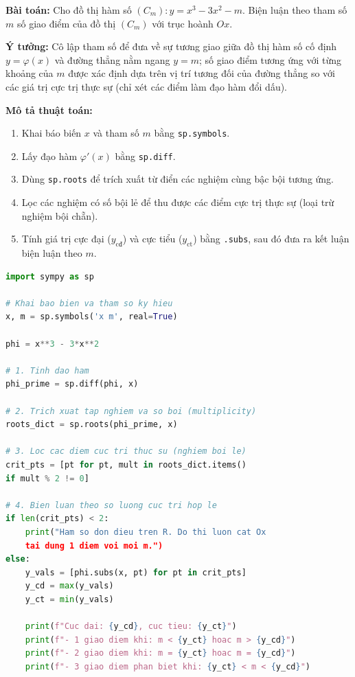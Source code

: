 \textbf{Bài toán:} Cho đồ thị hàm số $(C_m): y = x^3 - 3x^2 - m$. Biện luận theo tham số $m$ số giao điểm của đồ thị $(C_m)$ với trục hoành $Ox$.

\noindent\textbf{Ý tưởng:} Cô lập tham số để đưa về sự tương giao giữa đồ thị hàm số cố định $y = \varphi(x)$ và đường thẳng nằm ngang $y = m$; số giao điểm tương ứng với từng khoảng của $m$ được xác định dựa trên vị trí tương đối của đường thẳng so với các giá trị cực trị thực sự (chỉ xét các điểm làm đạo hàm đổi dấu).

\noindent\textbf{Mô tả thuật toán:}
\begin{enumerate}
    \item Khai báo biến $x$ và tham số $m$ bằng \texttt{sp.symbols}.
    \item Lấy đạo hàm $\varphi'(x)$ bằng \texttt{sp.diff}.
    \item Dùng \texttt{sp.roots} để trích xuất từ điển các nghiệm cùng bậc bội tương ứng.
    \item Lọc các nghiệm có số bội lẻ để thu được các điểm cực trị thực sự (loại trừ nghiệm bội chẵn).
    \item Tính giá trị cực đại ($y_{\text{cđ}}$) và cực tiểu ($y_{\text{ct}}$) bằng \texttt{.subs}, sau đó đưa ra kết luận biện luận theo $m$.
\end{enumerate}

\begin{lstlisting}[language=Python, caption={Biện luận số giao điểm có kiểm tra số bội của nghiệm đạo hàm}]
import sympy as sp

# Khai bao bien va tham so ky hieu
x, m = sp.symbols('x m', real=True)

phi = x**3 - 3*x**2

# 1. Tinh dao ham
phi_prime = sp.diff(phi, x)

# 2. Trich xuat tap nghiem va so boi (multiplicity)
roots_dict = sp.roots(phi_prime, x)

# 3. Loc cac diem cuc tri thuc su (nghiem boi le)
crit_pts = [pt for pt, mult in roots_dict.items() 
if mult % 2 != 0]

# 4. Bien luan theo so luong cuc tri hop le
if len(crit_pts) < 2:
    print("Ham so don dieu tren R. Do thi luon cat Ox 
    tai dung 1 diem voi moi m.")
else:
    y_vals = [phi.subs(x, pt) for pt in crit_pts]
    y_cd = max(y_vals)
    y_ct = min(y_vals)

    print(f"Cuc dai: {y_cd}, cuc tieu: {y_ct}")
    print(f"- 1 giao diem khi: m < {y_ct} hoac m > {y_cd}")
    print(f"- 2 giao diem khi: m = {y_ct} hoac m = {y_cd}")
    print(f"- 3 giao diem phan biet khi: {y_ct} < m < {y_cd}")
\end{lstlisting}

